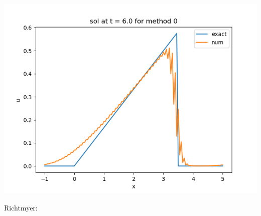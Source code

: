 \documentclass{article}
\begin{document}
\begin{center}
	\includegraphics[scale=.3]{hw13 sol t = 6 method 0}
\end{center}
Richtmyer:
\end{document}

